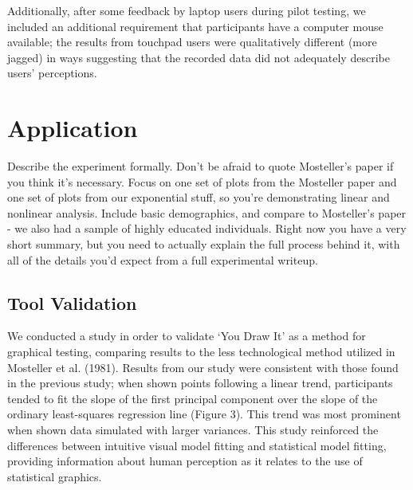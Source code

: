 \documentclass[
  letterpaper,
  DIV=11,
  numbers=noendperiod]{scrartcl}
\newcommand{\svp}[1]{{\textcolor{RedOrange}{#1}}}
\begin{document}
\svp{Additionally, after some feedback by laptop users during pilot testing, we included an additional requirement that participants have a computer mouse available; the results from touchpad users were qualitatively different (more jagged) in ways suggesting that the recorded data did not adequately describe users' perceptions.}

\hypertarget{application}{%
\section{Application}\label{application}}

\svp{Describe the experiment formally. Don't be afraid to quote Mosteller's paper if you think it's necessary. Focus on one set of plots from the Mosteller paper and one set of plots from our exponential stuff, so you're demonstrating linear and nonlinear analysis. Include basic demographics, and compare to Mosteller's paper - we also had a sample of highly educated individuals. Right now you have a very short summary, but you need to actually explain the full process behind it, with all of the details you'd expect from a full experimental writeup.}

\hypertarget{tool-validation}{%
\subsection{Tool Validation}\label{tool-validation}}

We conducted a study in order to validate `You Draw It' as a method for
graphical testing, comparing results to the less technological method
utilized in Mosteller et al. (1981). Results from our study were
consistent with those found in the previous study; when shown points
following a linear trend, participants tended to fit the slope of the
first principal component over the slope of the ordinary least-squares
regression line (Figure 3). This trend was most prominent when shown
data simulated with larger variances. This study reinforced the
differences between intuitive visual model fitting and statistical model
fitting, providing information about human perception as it relates to
the use of statistical graphics.
\end{document}
